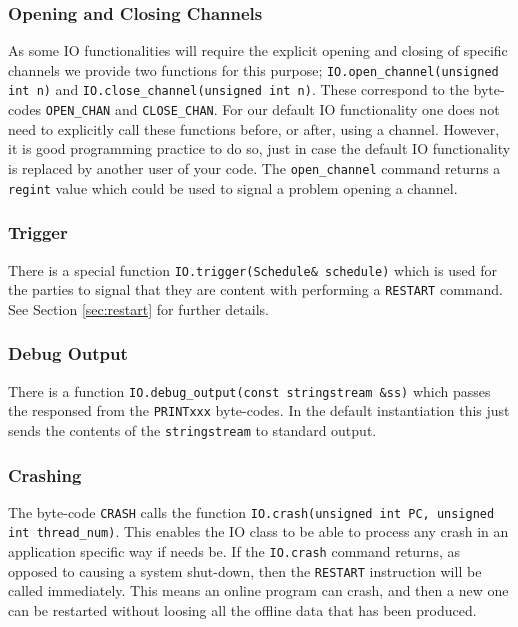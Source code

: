 \subsubsection{Opening and Closing Channels}
As some IO functionalities will require the explicit opening
and closing of specific channels we provide two functions
for this purpose;
\verb+IO.open_channel(unsigned int n)+
and
\verb+IO.close_channel(unsigned int n)+.
These correspond to the byte-codes \verb+OPEN_CHAN+ and
\verb+CLOSE_CHAN+.
For our default IO functionality one does not need to
explicitly call these functions before, or after,
using a channel.
However, it is good programming practice to do so, just
in case the default IO functionality is replaced by another
user of your code.
The \verb+open_channel+ command returns a \verb+regint+
value which could be used to signal a problem opening a channel.

\subsubsection{Trigger}
There is a special function \verb+IO.trigger(Schedule& schedule)+ 
which is used for the parties to signal that they are content with
performing a \verb+RESTART+ command.
See Section \ref{sec:restart} for further details.

\subsubsection{Debug Output}
There is a function \verb+IO.debug_output(const stringstream &ss)+
which passes the responsed from the \verb+PRINTxxx+ byte-codes.
In the default instantiation this just sends the contents
of the \verb+stringstream+ to standard output.

\subsubsection{Crashing}
The byte-code \verb+CRASH+ calls the function 
\verb+IO.crash(unsigned int PC, unsigned int thread_num)+.
This enables the IO class to be able to process any crash
in an application specific way if needs be.
If the \verb+IO.crash+ command returns, as opposed to causing
a system shut-down, then the \verb+RESTART+ instruction will
be called immediately.
This means an online program can crash, and then a new one
can be restarted without loosing all the offline data that
has been produced.

